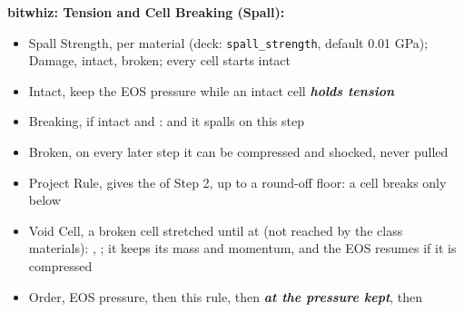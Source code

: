 \documentclass[11pt,addpoints]{exam}
\begin{document}
\begin{tcolorbox}[breakable]
\textbf{bitwhiz: Tension and Cell Breaking (Spall):}\vspace{.5em}
\begin{itemize}
\item Spall Strength, \hspace{3mm}  \hspace{2mm} per material (deck: \texttt{spall\_strength}, default 0.01 GPa); \hspace{3mm} Damage, \hspace{2mm}  intact,  broken; every cell starts intact\vspace{.5em}
\item Intact, \hspace{3mm} keep the EOS pressure while \hspace{2mm}  \hspace{7mm} an intact cell \textbf{\emph{holds tension}}\vspace{.5em}
\item Breaking, \hspace{3mm} if intact and \hspace{2mm} : \hspace{3mm}  \hspace{2mm} and \hspace{2mm}  \hspace{7mm} it spalls on this step\vspace{.5em}
\item Broken, \hspace{3mm}  \hspace{2mm} on every later step \hspace{7mm} it can be compressed and shocked, never pulled\vspace{.5em}
\item Project Rule, \hspace{3mm}  \hspace{2mm} gives the  of Step 2, \hspace{2mm} up to a round-off floor: a cell breaks only below \vspace{.5em}
\item Void Cell, \hspace{3mm} a broken cell stretched until  at  (not reached by the class materials): \hspace{2mm} , \hspace{2mm} ; it keeps its mass and momentum, and the EOS resumes if it is compressed\vspace{.5em}
\item Order, \hspace{3mm} EOS pressure, then this rule, then  \textbf{\emph{at the pressure kept}}, then 
\end{itemize}
\end{tcolorbox}
\end{document}

